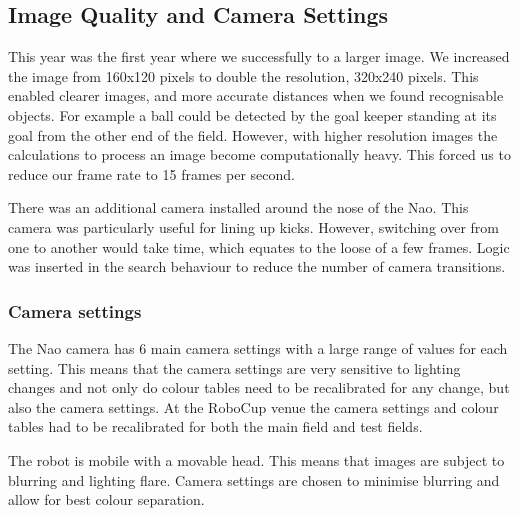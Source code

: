 

\subsection{Image Quality and Camera Settings}
This year was the first year where we successfully to a larger image. We increased the image from 160x120 pixels to double the resolution, 320x240 pixels. This enabled clearer images, and more accurate distances when we found recognisable objects. For example a ball could be detected by the goal keeper standing at its goal from the other end of the field. However, with higher resolution images the calculations to process an image become computationally heavy. This forced us to reduce our frame rate to 15 frames per second.

There was an additional camera installed around the nose of the Nao. This camera was particularly useful for lining up kicks. However, switching over from one to another would take time, which equates to the loose of a few frames. Logic was inserted in the search behaviour to reduce the number of camera transitions. 

\subsubsection{Camera settings}

The Nao camera has 6 main camera settings with a large range of values for each setting. This means that the camera settings are very sensitive to lighting changes and not only do colour tables need to be recalibrated for any change, but also the camera settings. At the RoboCup venue the camera settings and colour tables had to be recalibrated for both the main field and test fields. 

The robot is mobile with a movable head. This means that images are subject to blurring and lighting flare. Camera settings are chosen to minimise blurring and allow for best colour separation.

